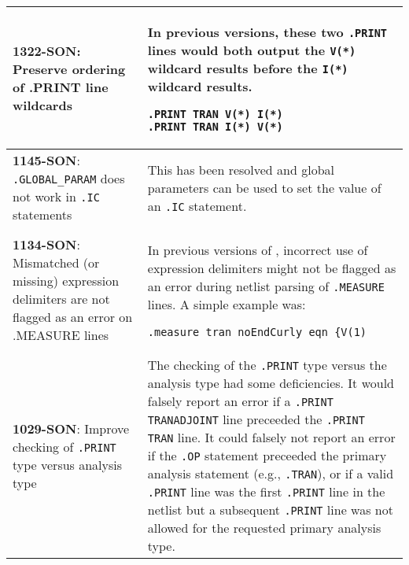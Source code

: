 {\begin{longtable}[h] {>{\raggedright\small}m{2in}|>{\raggedright\let\\\tabularnewline\small}m{3.5in}}
  \textbf{1322-SON}: Preserve ordering of .PRINT line wildcards &
In previous \Xyce{} versions, these two \texttt{.PRINT} lines would
both output the \texttt{V(*)} wildcard results before the \texttt{I(*)}
wildcard results.
\begin{verbatim}
.PRINT TRAN V(*) I(*)
.PRINT TRAN I(*) V(*)
\end{verbatim}
\\ \hline

  \textbf{1145-SON}: \texttt{.GLOBAL\_PARAM} does not work
in \texttt{.IC} statements & This has been resolved and global
parameters can be used to set the value of an \texttt{.IC}
statement.\\ \hline

  \textbf{1134-SON}: Mismatched (or missing) expression delimiters
are not flagged as an error on .MEASURE lines & In previous versions
of \Xyce{}, incorrect use of expression delimiters might not be
flagged as an error during netlist parsing of \texttt{.MEASURE}
lines.  A simple example was:
\begin{verbatim}
.measure tran noEndCurly eqn {V(1)
\end{verbatim}
\\ \hline

  \textbf{1029-SON}: Improve checking of \texttt{.PRINT} type versus
analysis type & The checking of the \texttt{.PRINT} type versus the
analysis type had some deficiencies. It would falsely report an error
if a \texttt{.PRINT TRANADJOINT} line preceeded the \texttt{.PRINT
TRAN} line.  It could falsely not report an error if the \texttt{.OP}
statement preceeded the primary analysis statement (e.g.,
\texttt{.TRAN}), or if a valid \texttt{.PRINT} line was the first \texttt{.PRINT}
line in the netlist but a subsequent \texttt{.PRINT} line was not allowed
for the requested primary analysis type. \\ \hline

\end{longtable}
}
